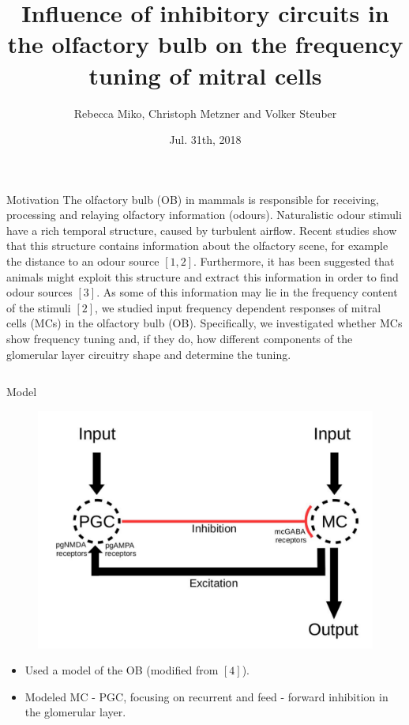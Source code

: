 \documentclass[final,hyperref={pdfpagelabels=false}]{beamer}
\title{Influence of inhibitory circuits in the olfactory bulb on the frequency tuning of mitral cells}
\author[Miko]{Rebecca Miko, Christoph Metzner and Volker Steuber}
\institute{University of Hertfordshire, AL10 9AB, UK}
\date{Jul. 31th, 2018}
\begin{document}
\begin{frame}{} 
\begin{block}{Motivation}
The olfactory bulb (OB) in mammals is responsible for receiving, processing and relaying olfactory information (odours). 
Naturalistic odour stimuli have a rich temporal structure, caused by turbulent airflow.
Recent studies show that this structure contains information about the olfactory scene, for example the distance to an odour source $[1,2]$. 
Furthermore, it has been suggested that animals might exploit this structure and extract this information in order to find odour sources $[3]$. 
As some of this information may lie in the frequency content of the stimuli $[2]$, we studied input frequency dependent responses of mitral cells (MCs) in the olfactory bulb (OB).
Specifically, we investigated whether MCs show frequency tuning and, if they do, how different components of the glomerular layer circuitry shape and determine the tuning.
\end{block}    
    
\begin{columns}[t]
\begin{column}{.48\linewidth}

\begin{block}{Model} 
\begin{figure}
\center
\includegraphics[scale=0.6]{images/Circuit_Diagram}
\end{figure}
\begin{itemize}
\item Used a model of the OB (modified from $[4]$).
\item Modeled MC - PGC, focusing on recurrent and feed - forward inhibition in the glomerular layer.
\end{itemize}
\end{block}


\end{column}
\end{columns}
\end{frame}
\end{document}
